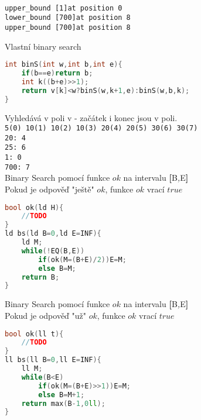 \documentclass[11pt]{article}
\begin{document}
\\\verb|upper_bound [1]at position 0|
\\\verb|lower_bound [700]at position 8|
\\\verb|upper_bound [700]at position 8|
\begin{center}
Vlastní binary search
\end{center}
\begin{lstlisting}[language=C++]
int binS(int w,int b,int e){
    if(b==e)return b;
    int k((b+e)>>1);
    return v[k]<w?binS(w,k+1,e):binS(w,b,k);
}
\end{lstlisting}
Vyhledává v poli \textsf{v} - začátek i konec jsou v poli.
\\\verb|5(0) 10(1) 10(2) 10(3) 20(4) 20(5) 30(6) 30(7)|
\\\verb|20: 4|
\\\verb|25: 6|
\\\verb|1: 0|
\\\verb|700: 7|
\\Binary Search pomocí funkce $ok$ na intervalu \textbf{[}\textsf{B}\textit{,}\textsf{E}\textbf{]}
\\Pokud je odpověď "ještě" $ok$, funkce $ok$ vrací $true$
\begin{lstlisting}[language=C++]
bool ok(ld H){
    //TODO
}
ld bs(ld B=0,ld E=INF){
    ld M;
    while(!EQ(B,E))
        if(ok(M=(B+E)/2))E=M;
        else B=M;
    return B;
}
\end{lstlisting}
Binary Search pomocí funkce $ok$ na intervalu \textbf{[}\textsf{B}\textit{,}\textsf{E}\textbf{]}
\\Pokud je odpověď "už" $ok$, funkce $ok$ vrací $true$
\begin{lstlisting}[language=C++]
bool ok(ll t){
    //TODO
}
ll bs(ll B=0,ll E=INF){
    ll M;
    while(B<E)
        if(ok(M=(B+E)>>1))E=M;
        else B=M+1;
    return max(B-1,0ll);
}
\end{lstlisting}
\end{document}
